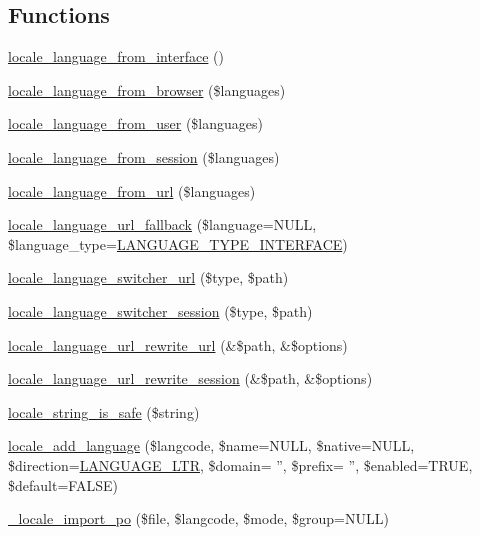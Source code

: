 \subsection*{Functions}
\begin{DoxyCompactItemize}
\item 
\hyperlink{group__locale_ga951d63c38235f5186fe6165589c4303f}{locale\_\-language\_\-from\_\-interface} ()
\item 
\hyperlink{group__locale_ga07f1b17e9dd116d07f6a2a02bfd6915e}{locale\_\-language\_\-from\_\-browser} (\$languages)
\item 
\hyperlink{group__locale_gae7cfd386cb96e33f7728374ef2e3dc42}{locale\_\-language\_\-from\_\-user} (\$languages)
\item 
\hyperlink{group__locale_ga4a15e35684fc4fe7a9486b5beee06f1b}{locale\_\-language\_\-from\_\-session} (\$languages)
\item 
\hyperlink{group__locale_gaf8f7a2acb2a80fbd8897437ab8eba1d6}{locale\_\-language\_\-from\_\-url} (\$languages)
\item 
\hyperlink{group__locale_ga0fe34148ed5e348c43882bcb3f9e418c}{locale\_\-language\_\-url\_\-fallback} (\$language=NULL, \$language\_\-type=\hyperlink{bootstrap_8inc_adcc8b40b0d1ee5cd37f1c7314cc541dc}{LANGUAGE\_\-TYPE\_\-INTERFACE})
\item 
\hyperlink{group__locale_ga73c68f3cdad0f635f29bdd5268d81af5}{locale\_\-language\_\-switcher\_\-url} (\$type, \$path)
\item 
\hyperlink{group__locale_ga62ade6d961ed1194a462bc27873fee64}{locale\_\-language\_\-switcher\_\-session} (\$type, \$path)
\item 
\hyperlink{group__locale_gaafdcd20ea42d6ce5573ece18d3fb9cdd}{locale\_\-language\_\-url\_\-rewrite\_\-url} (\&\$path, \&\$options)
\item 
\hyperlink{group__locale_ga510f99d2bec3b7011fe45efed603b1d5}{locale\_\-language\_\-url\_\-rewrite\_\-session} (\&\$path, \&\$options)
\item 
\hyperlink{locale_8inc_a60fba74a6fc736cec4df566aa165ca14}{locale\_\-string\_\-is\_\-safe} (\$string)
\item 
\hyperlink{group__locale_ga9fc28b9f10f5aaa7cb733dc0145018a2}{locale\_\-add\_\-language} (\$langcode, \$name=NULL, \$native=NULL, \$direction=\hyperlink{bootstrap_8inc_a8790965df4de009fe8bdcf17f6a5c738}{LANGUAGE\_\-LTR}, \$domain= '', \$prefix= '', \$enabled=TRUE, \$default=FALSE)
\item 
\hyperlink{group__locale_ga5d3d163017bea9499839ef6be09807de}{\_\-locale\_\-import\_\-po} (\$file, \$langcode, \$mode, \$group=NULL)

\end{DoxyCompactItemize}
